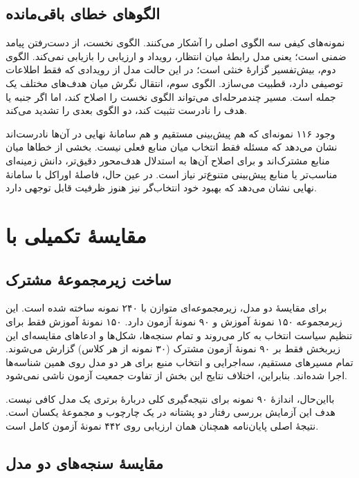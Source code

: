\subsection{الگوهای خطای باقی‌مانده}

نمونه‌های کیفی سه الگوی اصلی را آشکار می‌کنند. الگوی نخست، از دست‌رفتن پیامد ضمنی است؛ یعنی مدل رابطۀ میان انتظار، رویداد و ارزیابی را بازیابی نمی‌کند. الگوی دوم، بیش‌تفسیر گزارۀ خنثی است؛ در این حالت مدل از رویدادی که فقط اطلاعات توصیفی دارد، قطبیت می‌سازد. الگوی سوم، انتقال نگرش میان هدف‌های مختلف یک جمله است. مسیر چندمرحله‌ای می‌تواند الگوی نخست را اصلاح کند، اما اگر جنبه یا هدف را نادرست تثبیت کند، دو الگوی بعدی را تشدید می‌کند.

وجود ۱۱۶ نمونه‌ای که هم پیش‌بینی مستقیم و هم سامانۀ نهایی در آن‌ها نادرست‌اند نشان می‌دهد که مسئله فقط انتخاب میان منابع فعلی نیست. بخشی از خطاها میان منابع مشترک‌اند و برای اصلاح آن‌ها به استدلال هدف‌محور دقیق‌تر، دانش زمینه‌ای مناسب‌تر یا منابع پیش‌بینی متنوع‌تر نیاز است. در عین حال، فاصلۀ اوراکل با سامانۀ نهایی نشان می‌دهد که بهبود خود انتخاب‌گر نیز هنوز ظرفیت قابل توجهی دارد.

\section{مقایسۀ تکمیلی با }

\subsection{ساخت زیرمجموعۀ مشترک}

برای مقایسۀ دو مدل، زیرمجموعه‌ای متوازن با ۲۴۰ نمونه ساخته شده است. این زیرمجموعه ۱۵۰ نمونۀ آموزش و ۹۰ نمونۀ آزمون دارد. ۱۵۰ نمونۀ آموزش فقط برای تنظیم سیاست انتخاب به کار می‌روند و تمام سنجه‌ها، شکل‌ها و ادعاهای مقایسه‌ای این زیربخش فقط بر ۹۰ نمونۀ آزمون مشترک (۳۰ نمونه از هر کلاس) گزارش می‌شوند. تمام مسیرهای مستقیم،  سه‌اجرایی و انتخاب منبع برای هر دو مدل روی همین شناسه‌ها اجرا شده‌اند. بنابراین، اختلاف نتایج این بخش از تفاوت جمعیت آزمون ناشی نمی‌شود.

بااین‌حال، اندازۀ ۹۰ نمونه برای نتیجه‌گیری کلی دربارۀ برتری یک مدل کافی نیست. هدف این آزمایش بررسی رفتار دو پشتانه در یک چارچوب و مجموعۀ یکسان است. نتیجۀ اصلی پایان‌نامه همچنان همان ارزیابی  روی ۴۴۲ نمونۀ آزمون کامل است.

\subsection{مقایسۀ سنجه‌های دو مدل}

